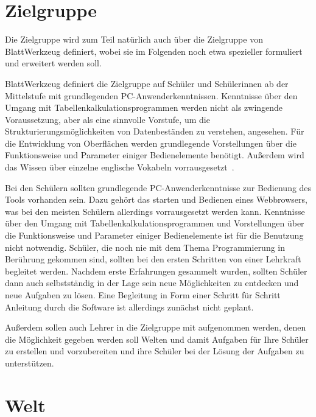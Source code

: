 \section{Zielgruppe}
\label{sec:requirements:target}

Die Zielgruppe wird zum Teil natürlich auch über die Zielgruppe von BlattWerkzeug definiert, wobei sie im Folgenden noch etwa spezieller formuliert und erweitert werden soll.

BlattWerkzeug definiert die Zielgruppe auf Schüler und Schülerinnen ab der Mittelstufe mit grundlegenden PC-Anwenderkenntnissen. Kenntnisse über den Umgang mit Tabellenkalkulationsprogrammen werden nicht als zwingende Voraussetzung, aber als eine sinnvolle Vorstufe, um die Strukturierungsmöglichkeiten von Datenbeständen zu verstehen, angesehen. Für die Entwicklung von Oberflächen werden grundlegende Vorstellungen über die Funktionsweise und Parameter einiger Bedienelemente benötigt. Außerdem wird das Wissen über einzelne englische Vokabeln vorrausgesetzt~\cite[22-23]{riemer2016}.

Bei den Schülern sollten grundlegende PC-Anwenderkenntnisse zur Bedienung des Tools vorhanden sein. Dazu gehört das starten und Bedienen eines Webbrowsers, was bei den meisten Schülern allerdings vorrausgesetzt werden kann. Kenntnisse über den Umgang mit Tabellenkalkulationsprogrammen und Vorstellungen über die Funktionsweise und Parameter einiger Bedienelemente ist für die Benutzung nicht notwendig. Schüler, die noch nie mit dem Thema Programmierung in Berührung gekommen sind, sollten bei den ersten Schritten von einer Lehrkraft begleitet werden. Nachdem erste Erfahrungen gesammelt wurden, sollten Schüler dann auch selbstständig in der Lage sein neue Möglichkeiten zu entdecken und neue Aufgaben zu lösen. Eine Begleitung in Form einer Schritt für Schritt Anleitung durch die Software ist allerdings zunächst nicht geplant.

Außerdem sollen auch Lehrer in die Zielgruppe mit aufgenommen werden, denen die Möglichkeit gegeben werden soll Welten und damit Aufgaben für Ihre Schüler zu erstellen und vorzubereiten  und ihre Schüler bei der Lösung der Aufgaben zu unterstützen.

\section{Welt}
\label{sec:requirements:world}

